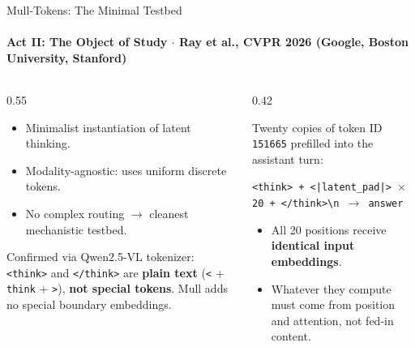 \documentclass[aspectratio=169, 10pt]{beamer}
\begin{document}

\begin{frame}[fragile]{Mull-Tokens: The Minimal Testbed}
  \framesubtitle{Act II: The Object of Study $\cdot$ Ray et al., CVPR 2026 (Google, Boston University, Stanford)}
  
  \begin{columns}[T]
    \begin{column}{0.55\textwidth}
      \begin{tcolorbox}[accentcard, title=\textbf{Why Mull-Tokens?}]
        \small
        \begin{itemize}\setlength{\itemsep}{3pt}
          \item Minimalist instantiation of latent thinking.
          \item Modality-agnostic: uses uniform discrete tokens.
          \item No complex routing $\rightarrow$ cleanest mechanistic testbed.
        \end{itemize}
      \end{tcolorbox}
      
      \begin{tcolorbox}[metriccard, title=\textbf{Tokenizer Ground Truth}]
        \small
        Confirmed via Qwen2.5-VL tokenizer:\\
        \texttt{<think>} and \texttt{</think>} are \textbf{plain text} (\texttt{<} + \texttt{think} + \texttt{>}), \textbf{not special tokens}. Mull adds no special boundary embeddings.
      \end{tcolorbox}
    \end{column}
    
    \begin{column}{0.42\textwidth}
      \begin{tcolorbox}[metriccard, title=\textbf{Inference-Time Intervention}]
        \footnotesize
        Twenty copies of token ID \texttt{151665} prefilled into the assistant turn:
        \vspace{3pt}
        \begin{center}
          \texttt{<think> + <|latent\_pad|> $\times$ 20 + </think>\textbackslash n $\rightarrow$ answer}
        \end{center}
        \vspace{3pt}
        \begin{itemize}\setlength{\itemsep}{2pt}
          \item All 20 positions receive \textbf{identical input embeddings}.
          \item Whatever they compute must come from position and attention, not fed-in content.
        \end{itemize}
      \end{tcolorbox}
    \end{column}
  \end{columns}


\end{frame}
\end{document}
